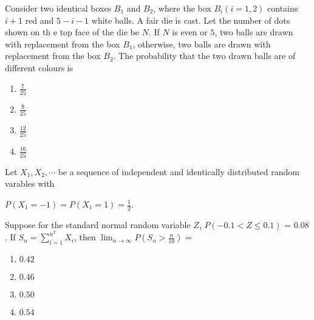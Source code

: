                 \item Consider two identical boxes $B_{1}$ and $B_{2}$, where the box $B_{i}(i=1,2)$ contains $i+1$ red and  $5-i-1$ white balls. A fair die is cast. Let the number of dots shown on th                      e top face of the die be $ N$. If $ N$ is even or $5$, two balls are drawn with replacement from the box $B_{1}$, otherwise, two balls are drawn with replacement from the box $B_                      {2}$. The probability that the two drawn balls are of different colours is 
                \begin{multicols}{4}
                \begin{enumerate}
                    \item $\frac{7}{25}$
                    \item $\frac{9}{25}$
                    \item $\frac{12}{25}$
                    \item $\frac{16}{25}$
                \end{enumerate}
                \end{multicols}

                \item Let $X_1,X_2, \cdots$ be a sequence of independent and identically distributed random varables with
                \begin{center}
                   $P(X_1=-1) = P(X_1=1) = \frac{1}{2}$. 
                \end{center}
                Suppose for the standard normal random  variable $Z$, $P(-0.1<Z\le0.1)$ = $0.08$.
                If $S_n = \sum_{i=1}^{n^2} X_i$, then $\lim_{n \to \infty} P(S_n>\frac{n}{10})$ =
                \begin{multicols}{4}
                \begin{enumerate}
                    \item $0.42$
                    \item $0.46$
                    \item $0.50$
                    \item $0.54$
                \end{enumerate}
                    
                \end{multicols}

